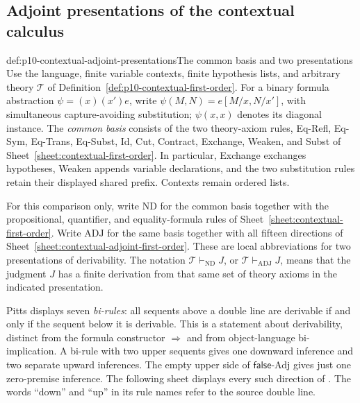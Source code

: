 
\subsection{Adjoint presentations of the contextual calculus}
\label{sec:p10-adjoint-first-order-calculus}

\begin{hbdefinition}{def:p10-contextual-adjoint-presentations}{The common basis and two presentations}
Use the language, finite variable contexts, finite hypothesis lists,
and arbitrary theory \(\mathcal T\) of
Definition~\ref{def:p10-contextual-first-order}.
For a binary formula abstraction \(\psi=(x)(x')e\), write
\(\psi(M,N)=e[M/x,N/x']\), with simultaneous capture-avoiding
substitution; \(\psi(x,x)\) denotes its diagonal instance.
The \emph{common basis} consists of the two theory-axiom rules,
Eq-Refl, Eq-Sym, Eq-Trans, Eq-Subst, Id, Cut, Contract, Exchange,
Weaken, and Subst of Sheet~\ref{sheet:contextual-first-order}.
In particular, Exchange exchanges hypotheses, Weaken appends variable
declarations, and the two substitution rules retain their displayed
shared prefix. Contexts remain ordered lists.

For this comparison only, write \(\mathrm{ND}\) for the common basis
together with the propositional, quantifier, and equality-formula
rules of Sheet~\ref{sheet:contextual-first-order}.
Write \(\mathrm{ADJ}\) for the same basis together with all fifteen
directions of Sheet~\ref{sheet:contextual-adjoint-first-order}.
These are local abbreviations for two presentations of derivability.
The notation \(\mathcal T\vdash_{\mathrm{ND}}J\), or
\(\mathcal T\vdash_{\mathrm{ADJ}}J\), means that the judgment \(J\)
has a finite derivation from that same set of theory axioms in the
indicated presentation.
\end{hbdefinition}

Pitts displays seven \emph{bi-rules}: all sequents above a double
line are derivable if and only if the sequent below it is derivable.
This is a statement about derivability, distinct from the formula
constructor \(\Rightarrow\) and from object-language bi-implication.
A bi-rule with two upper sequents gives one downward inference and
two separate upward inferences. The empty upper side of
\(\mathsf{false}\)-Adj gives just one zero-premise inference.
The following sheet displays every such direction of
\cite[Figures~4, 6, and~8, pp.~48, 52, and~55]{Pitts1995Draft}.
The words ``down'' and ``up'' in its rule names refer to the source
double line.

